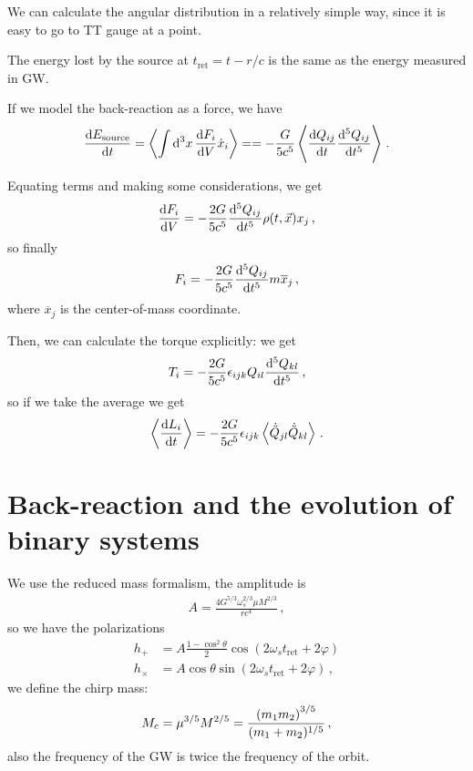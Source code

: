 \documentclass[main.tex]{subfiles}
\begin{document}
We can calculate the angular distribution in a relatively simple way, since it is easy to go to TT gauge at a point. 

The energy lost by the source at \(t _{\text{ret}} = t - r/c \) is the same as the energy measured in GW. 

If we model the back-reaction as a force, we have 
%
\begin{align}
\dv{E _{\text{source}}}{t} = 
\expval{\int  \dd[3]{x} \dv{F_i}{V} \dot{x}_{i}} = 
= - \frac{G}{5 c^{5}} \expval{\dv{Q_{ij}}{t} \dv[5]{Q_{ij}}{t}}
\,.
\end{align}

Equating terms and making some considerations, we get 
%
\begin{align}
\dv{F_{i}}{V} = - \frac{2G}{5c^{5}} \dv[5]{Q_{ij}}{t} \rho (t, \vec{x}) x_{j}
\,,
\end{align}
%
so finally 
%
\begin{align}
F_{i} = - \frac{2G}{5c^{5}} \dv[5]{Q_{ij}}{t} m \overline{x}_{j}
\,,
\end{align}
%
where \(\overline{x}_{j} \) is the center-of-mass coordinate. 

Then, we can calculate the torque explicitly: we get 
%
\begin{align}
T_{i} = - \frac{2G}{5c^{5}} \epsilon_{ijk} Q_{il} \dv[5]{Q_{kl}}{t}
\,,
\end{align}
%
so if we take the average we get 
%
\begin{align}
\expval{\dv{L_{i}}{t}} = -\frac{2G}{5c^{5}} \epsilon_{ijk} 
\expval{\dot{\ddot{Q}}_{jl} \dot{\ddot{Q}}_{kl}}
\,.
\end{align}

\section{Back-reaction and the evolution of binary systems}

We use the reduced mass formalism, the amplitude is 
%
\begin{align}
A = \frac{4 G^{5/3} \omega_{s}^{2/3} \mu M^{2/3}}{r c^{4}}
\,,
\end{align}
%
so we have the polarizations 
%
\begin{subequations}
\begin{align}
h_{+} &= A \frac{1 - \cos^2\theta   }{2} \cos(2 \omega_{s} t _{\text{ret}} + 2 \varphi ) \\ 
h_{\times } &= A \cos \theta  \sin(2 \omega_{s} t _{\text{ret}} + 2 \varphi )  
\,,
\end{align}
\end{subequations}
%
we define the chirp mass: 
%
\begin{align}
M_c = \mu ^{3/5} M^{2/5} = \frac{\qty(m_1 m_2 )^{3/5}}{(m_1 + m_2 )^{1/5}}
\,,
\end{align}
%
also the frequency of the GW is twice the frequency of the orbit. 
\end{document}
